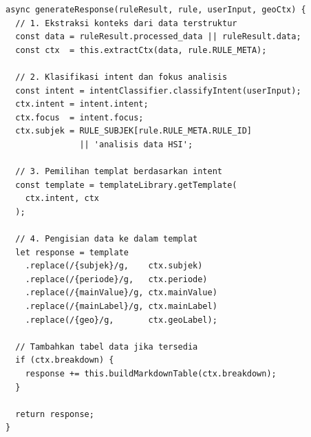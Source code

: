 \begin{lstlisting}[caption={Fungsi Pembangkitan Respons NLG}, label={lst:nlg-generator}, style=jsstyle]
async generateResponse(ruleResult, rule, userInput, geoCtx) {
  // 1. Ekstraksi konteks dari data terstruktur
  const data = ruleResult.processed_data || ruleResult.data;
  const ctx  = this.extractCtx(data, rule.RULE_META);

  // 2. Klasifikasi intent dan fokus analisis
  const intent = intentClassifier.classifyIntent(userInput);
  ctx.intent = intent.intent;
  ctx.focus  = intent.focus;
  ctx.subjek = RULE_SUBJEK[rule.RULE_META.RULE_ID]
               || 'analisis data HSI';

  // 3. Pemilihan templat berdasarkan intent
  const template = templateLibrary.getTemplate(
    ctx.intent, ctx
  );

  // 4. Pengisian data ke dalam templat
  let response = template
    .replace(/{subjek}/g,    ctx.subjek)
    .replace(/{periode}/g,   ctx.periode)
    .replace(/{mainValue}/g, ctx.mainValue)
    .replace(/{mainLabel}/g, ctx.mainLabel)
    .replace(/{geo}/g,       ctx.geoLabel);

  // Tambahkan tabel data jika tersedia
  if (ctx.breakdown) {
    response += this.buildMarkdownTable(ctx.breakdown);
  }

  return response;
}
\end{lstlisting}
